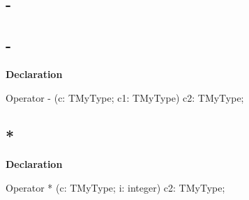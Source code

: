 \documentclass{report}
\newif\ifpdf
\begin{document}
\subsection*{\large{\textbf{-}}\normalsize\hspace{1ex}\hrulefill}
\else
\subsection*{-}
\fi
\label{ok_operator_test--}
\index{-}
\begin{list}{}{
\setlength{\itemindent}{0cm}
\setlength{\listparindent}{0cm}
\setlength{\leftmargin}{\evensidemargin}
\addtolength{\leftmargin}{\tmplength}
\settowidth{\labelsep}{X}
\addtolength{\leftmargin}{\labelsep}
\setlength{\labelwidth}{\tmplength}
}
\item[\textbf{Declaration}\hfill]
\ifpdf
\begin{flushleft}
\fi
\begin{ttfamily}
Operator - (c: TMyType; c1: TMyType) c2: TMyType;\end{ttfamily}

\ifpdf
\end{flushleft}
\fi

\end{list}
\ifpdf
\subsection*{\large{\textbf{*}}\normalsize\hspace{1ex}\hrulefill}
\else
\subsection*{*}
\fi
\label{ok_operator_test-*}
\index{*}
\begin{list}{}{
\setlength{\itemindent}{0cm}
\setlength{\listparindent}{0cm}
\setlength{\leftmargin}{\evensidemargin}
\addtolength{\leftmargin}{\tmplength}
\settowidth{\labelsep}{X}
\addtolength{\leftmargin}{\labelsep}
\setlength{\labelwidth}{\tmplength}
}
\item[\textbf{Declaration}\hfill]
\ifpdf
\begin{flushleft}
\fi
\begin{ttfamily}
Operator * (c: TMyType; i: integer) c2: TMyType;\end{ttfamily}

\ifpdf
\end{flushleft}
\fi

\end{list}
\ifpdf
\end{document}

